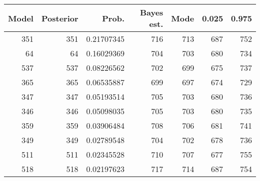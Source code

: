 \begin{table}[ht]
\centering
\begin{tabular}{rrrrrrr}
  \hline
Model & Posterior & Prob. & Bayes est. & Mode & 0.025 & 0.975 \\ 
  \hline
351 & 351 & 0.21707345 & 716 & 713 & 687 & 752 \\ 
  64 & 64 & 0.16029369 & 704 & 703 & 680 & 734 \\ 
  537 & 537 & 0.08226562 & 702 & 699 & 675 & 737 \\ 
  365 & 365 & 0.06535887 & 699 & 697 & 674 & 729 \\ 
  347 & 347 & 0.05193514 & 705 & 703 & 680 & 736 \\ 
  346 & 346 & 0.05098035 & 705 & 703 & 680 & 735 \\ 
  359 & 359 & 0.03906484 & 708 & 706 & 681 & 741 \\ 
  349 & 349 & 0.02789548 & 704 & 702 & 678 & 736 \\ 
  511 & 511 & 0.02345528 & 710 & 707 & 677 & 755 \\ 
  518 & 518 & 0.02197623 & 717 & 714 & 687 & 754 \\ 
   \hline
\end{tabular}
\end{table}

